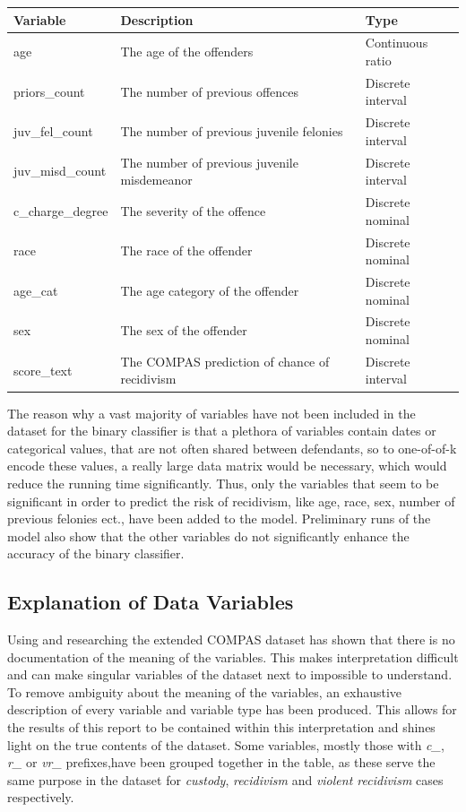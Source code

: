 \documentclass[11pt, fleqn, titlepage]{article}
\begin{document}
	
	\begin{table}[H]\label{resultater}
		\centering
		\begin{tabular}{l l l}
			Variable & Description & Type \\ \hline
			age & The age of the offenders & Continuous ratio \\
			priors\_count & The number of previous offences & Discrete interval \\
			juv\_fel\_count & The number of previous juvenile felonies & Discrete interval \\
			juv\_misd\_count & The number of previous juvenile misdemeanor & Discrete interval \\
			c\_charge\_degree & The severity of the offence & Discrete nominal \\
			race & The race of the offender & Discrete nominal \\
			age\_cat & The age category of the offender & Discrete nominal \\
			sex & The sex of the offender & Discrete nominal \\
			score\_text & The COMPAS prediction of chance of recidivism & Discrete interval
		\end{tabular}
	\end{table} \noindent
	The reason why a vast majority of variables have not been included in the dataset for the binary classifier is that a plethora of variables contain dates or categorical values, that are not often shared between defendants, so to one-of-of-k encode these values, a really large data matrix would be necessary, which would reduce the running time significantly. Thus, only the variables that seem to be significant in order to predict the risk of recidivism, like age, race, sex, number of previous felonies ect., have been added to the model. Preliminary runs of the model also show that the other variables do not significantly enhance the accuracy of the binary classifier.
		
		
	\subsection{Explanation of Data Variables} \label{dataExamination}
	Using and researching the extended COMPAS dataset has shown that there is no documentation of the meaning of the variables. This makes interpretation difficult and can make singular variables of the dataset next to impossible to understand. To remove ambiguity about the meaning of the variables, an exhaustive description of every variable and variable type has been produced. This allows for the results of this report to be contained within this interpretation and shines light on the true contents of the dataset. Some variables, mostly those with \textit{c\_}, \textit{r\_} or \textit{vr\_} prefixes,have been grouped together in the table, as these serve the same purpose in the dataset for \textit{custody}, \textit{recidivism} and \textit{violent recidivism} cases respectively. 
	
\end{document}
